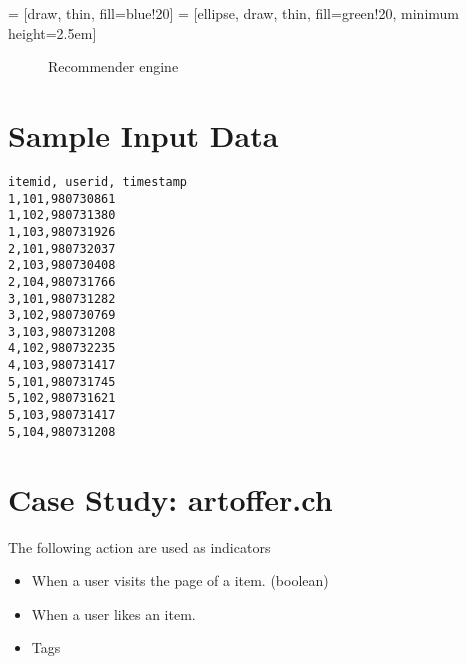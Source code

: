\documentclass[twoside,a4paper]{article}
\begin{document}
 = [draw, thin, fill=blue!20]
 = [ellipse, draw, thin, fill=green!20, minimum height=2.5em]
\begin{figure}
\centering
{}
\caption{Recommender engine}
\end{figure}

\section{Sample Input Data}
\label{sec:sampleinput}

\begin{verbatim}
itemid, userid, timestamp
1,101,980730861
1,102,980731380
1,103,980731926
2,101,980732037
2,103,980730408
2,104,980731766
3,101,980731282
3,102,980730769
3,103,980731208
4,102,980732235
4,103,980731417
5,101,980731745
5,102,980731621
5,103,980731417
5,104,980731208
\end{verbatim}


\section{Case Study: artoffer.ch}
\label{sec:artoffer}

The following action are used as indicators
\begin{itemize}
\item When a user visits the page of a item. (boolean)
\item When a user likes an item.
\item Tags
\end{itemize}
\printglossary


\end{document}
